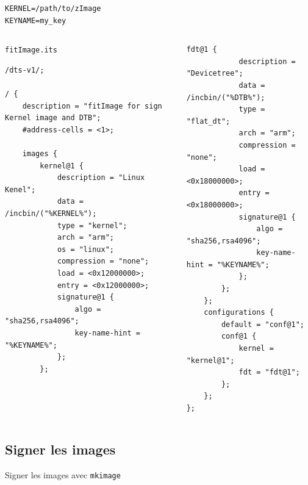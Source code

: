 \documentclass[aspectratio=169]{beamer}
\begin{document}
\begin{frame}[fragile]
\begin{lstlisting}[style=shell,basicstyle=\tiny\ttfamily\color{white}]
KERNEL=/path/to/zImage
KEYNAME=my_key
\end{lstlisting}
\begin{columns}
\begin{column}{0.5\textwidth}
\texttt{fitImage.its}
\begin{lstlisting}[style=shell,basicstyle=\tiny\ttfamily\color{white}]
/dts-v1/;

/ {
	description = "fitImage for sign Kernel image and DTB";
	#address-cells = <1>;

	images {
		kernel@1 {
			description = "Linux Kenel";
			data = /incbin/("%KERNEL%");
			type = "kernel";
			arch = "arm";
			os = "linux";
			compression = "none";
			load = <0x12000000>;
			entry = <0x12000000>;
			signature@1 {
				algo = "sha256,rsa4096";
				key-name-hint = "%KEYNAME%";
			};
		};
\end{lstlisting}
\end{column}
\begin{column}{0.5\textwidth}
\begin{lstlisting}[style=shell,basicstyle=\tiny\ttfamily\color{white}]
		fdt@1 {
			description = "Devicetree";
			data = /incbin/("%DTB%");
			type = "flat_dt";
			arch = "arm";
			compression = "none";
			load = <0x18000000>;
			entry = <0x18000000>;
			signature@1 {
				algo = "sha256,rsa4096";
				key-name-hint = "%KEYNAME%";
			};
		};
	};
	configurations {
		default = "conf@1";
		conf@1 {
			kernel = "kernel@1";
			fdt = "fdt@1";
		};
	};
};
\end{lstlisting}
\end{column}
\end{columns}
\end{frame}



\subsection{Signer les images}

\begin{frame}
\begin{center}
\large{Signer les images avec \texttt{mkimage}}
\end{center}
\end{frame}
\end{document}
